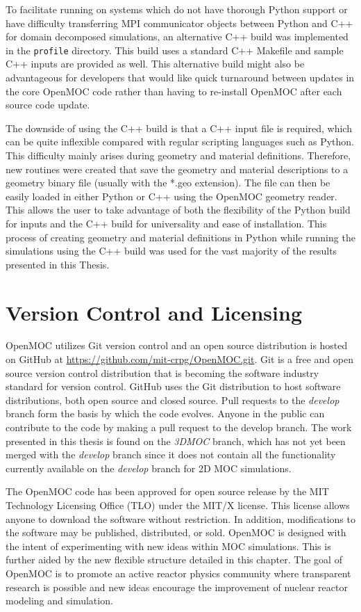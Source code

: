 To facilitate running on systems which do not have thorough Python support or have difficulty transferring MPI communicator objects between Python and C++ for domain decomposed simulations, an alternative C++ build was implemented in the \texttt{profile} directory. This build uses a standard C++ Makefile and sample C++ inputs are provided as well. This alternative build might also be advantageous for developers that would like quick turnaround between updates in the core OpenMOC code rather than having to re-install OpenMOC after each source code update. 

The downside of using the C++ build is that a C++ input file is required, which can be quite inflexible compared with regular scripting languages such as Python. This difficulty mainly arises during geometry and material definitions. Therefore, new routines were created that save the geometry and material descriptions to a geometry binary file (usually with the *.geo extension). The file can then be easily loaded in either Python or C++ using the OpenMOC geometry reader. This allows the user to take advantage of both the flexibility of the Python build for inputs and the C++ build for universality and ease of installation. This process of creating geometry and material definitions in Python while running the simulations using the C++ build was used for the vast majority of the results presented in this Thesis.

\section{Version Control and Licensing}
\label{sec:version-control}

OpenMOC utilizes Git version control and an open source distribution is hosted on GitHub at \url{https://github.com/mit-crpg/OpenMOC.git}. Git is a free and open source version control distribution that is becoming the software industry standard for version control. GitHub uses the Git distribution to host software distributions, both open source and closed source. Pull requests to the \textit{develop} branch form the basis by which the code evolves. Anyone in the public can contribute to the code by making a pull request to the develop branch. The work presented in this thesis is found on the \textit{3DMOC} branch, which has not yet been merged with the \textit{develop} branch since it does not contain all the functionality currently available on the \textit{develop} branch for 2D MOC simulations.

The OpenMOC code has been approved for open source release by the MIT Technology Licensing Office (TLO) under the MIT/X license. This license allows anyone to download the software without restriction. In addition, modifications to the software may be published, distributed, or sold. OpenMOC is designed with the intent of experimenting with new ideas within MOC simulations. This is further aided by the new flexible structure detailed in this chapter. The goal of OpenMOC is to promote an active reactor physics community where transparent research is possible and new ideas encourage the improvement of nuclear reactor modeling and simulation.